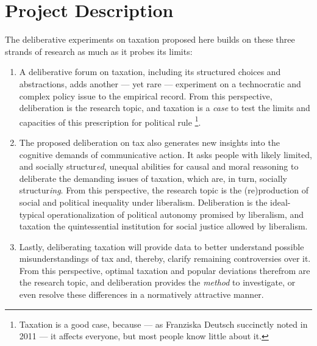 \section{Project Description}



The deliberative experiments on taxation proposed here builds on these three strands of research as much as it probes its limits:

\begin{enumerate}
\item 
	A deliberative forum on taxation, including its structured choices and abstractions, adds another --- yet rare --- experiment on a technocratic and complex policy issue to the empirical record.
	From this perspective, deliberation is the research topic, and taxation is a \emph{case} to test the limits and capacities of this prescription for political {rule}
	\footnote{
		Taxation is a good case, because --- as Franziska Deutsch succinctly noted in 2011 --- it affects everyone, but most people know little about it.
	}.
	
\item The proposed deliberation on tax also generates new insights into the cognitive demands of communicative action.
	It asks people with likely limited, and socially structur\emph{ed}, unequal abilities for causal and moral reasoning to deliberate the demanding issues of taxation, which are, in turn, socially structur\emph{ing}.
	From this perspective, the research topic is the (re)production of social and political inequality under liberalism.
	Deliberation is the ideal-typical operationalization of political autonomy promised by liberalism, and taxation the quintessential institution for social justice allowed by liberalism. %
	
\item Lastly, deliberating taxation will provide data to better understand possible misunderstandings of tax and, thereby, clarify remaining controversies over it.
	From this perspective, optimal taxation and popular deviations therefrom are the research topic, and deliberation provides the \emph{method} to investigate, or even resolve these differences in a normatively attractive \citep{Rawls-1971-aa,Habermas-1984-aa} manner.
\end{enumerate}

